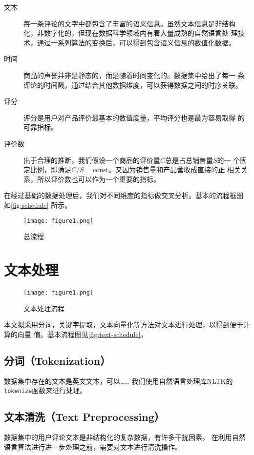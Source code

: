 \begin{description}
    \item [文本] 每一条评论的文字中都包含了丰富的语义信息。虽然文本信息是非结构
        化，非数字化的，但现在数据科学领域内有着大量成熟的{\fKai 自然语言处
        理}技术，通过一系列算法的变换后，可以得到包含语义信息的数值化数据。
    \item [时间] 商品的声誉并非是静态的，而是随着时间变化的。数据集中给出了每一
        条评论的时间戳，通过结合其他数据维度，可以获得数据之间的时序关联。
    \item [评分] 评分是用户对产品评价最基本的数值度量，平均评分也是最为容易取得
        的可靠指标。
    \item [评价数] 出于合理的推断，我们假设一个商品的评价量$C$总是占总销售量$S$的一
        个固定比例，即满足$C/S=\textrm{const}$。又因为销售量和产品营收成直接的正
        相关关系，所以评价数也可以作为一个重要的指标。
\end{description}

在经过基础的数据处理后，我们对不同维度的指标做交叉分析。基本的流程框图
如\autoref{fig:schedule} 所示。

\begin{figure}
    \centering
    \texttt{[image: figure1.png]}
    \caption{总流程}
    \label{fig:schedule}
\end{figure}


\section{文本处理}

\begin{figure}
    \centering
    \texttt{[image: figure1.png]}
    \caption{文本处理流程}
    \label{fig:text-schedule}
\end{figure}

本文拟采用分词，关键字提取，文本向量化等方法对文本进行处理，以得到便于计算的向量
值。基本流程图见\autoref{fig:text-schedule}。

\subsection{分词（Tokenization）}
数据集中存在的文本是英文文本，可以……
我们使用自然语言处理库NLTK的\texttt{tokenize}函数来进行处理。

\subsection{文本清洗（Text Preprocessing）}
数据集中的用户评论文本是非结构化的复杂数据，有许多干扰因素。
在利用自然语言算法进行进一步处理之前，需要对文本进行清洗操作。

